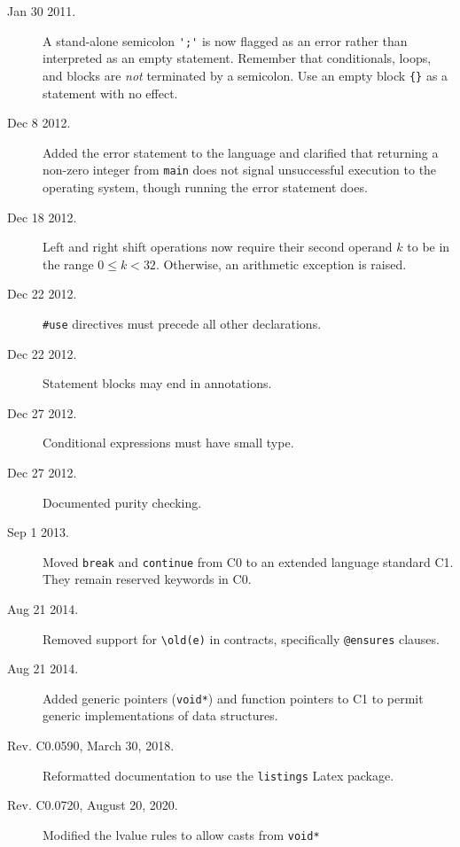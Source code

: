 \documentclass[11pt]{article}
\begin{document}
\begin{description}
\item[Jan 30 2011.]%
  A stand-alone semicolon \lstinline"';'" is now flagged as an error
  rather than interpreted as an empty statement.  Remember that
  conditionals, loops, and blocks are \emph{not} terminated by a
  semicolon.  Use an empty block \lstinline'{}' as a statement with no
  effect.
\item[Dec 8 2012.]%
  Added the error statement to the language and clarified that
  returning a non-zero integer from \lstinline'main' does not signal
  unsuccessful execution to the operating system, though running the
  error statement does.
\item[Dec 18 2012.]%
  Left and right shift operations now require their second operand $k$
  to be in the range $0 \leq k < 32$.  Otherwise, an arithmetic
  exception is raised.
\item[Dec 22 2012.]%
  \lstinline'#use' directives must precede all other declarations.
\item[Dec 22 2012.]%
  Statement blocks may end in annotations.
\item[Dec 27 2012.]%
  Conditional expressions must have small type.
\item[Dec 27 2012.]%
  Documented purity checking.
\item[Sep 1 2013.]%
  Moved \lstinline'break' and \lstinline'continue' from C0 to an
  extended language standard C1.  They remain reserved keywords in C0.
\item[Aug 21 2014.]%
  Removed support for \lstinline'\old(e)' in contracts, specifically
  \lstinline'@ensures' clauses.
\item[Aug 21 2014.]%
  Added generic pointers (\lstinline'void*') and function pointers to
  C1 to permit generic implementations of data structures.
\item[Rev. C0.0590, March 30, 2018.]%
  Reformatted documentation to use the \lstinline'listings' Latex
  package.
\item[Rev. C0.0720, August 20, 2020.]%
  Modified the lvalue rules to allow casts from \lstinline'void*'
\end{description}
\end{document}
